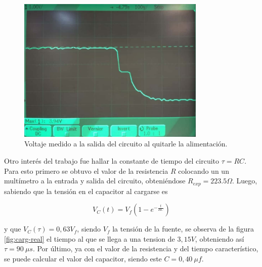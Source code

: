 \documentclass[a4paper]{article}
\begin{document}
\begin{figure}[H]
	\centering
	\includegraphics[width=0.8\textwidth]{Descarga-transitoria-real.jpeg}
	\caption{Voltaje medido a la salida del circuito al quitarle la alimentación.}
	\label{fig:desc-real}
\end{figure}


Otro interés del trabajo fue hallar la constante de tiempo del circuito $ \tau = RC $. Para esto primero se obtuvo el valor de la resistencia $ R $ colocando un un multímetro a la entrada y salida del circuito, obteniéndose $ R_{exp} = 223.5 \Omega $.
Luego, sabiendo que la tensión en el capacitor al cargarse es

\begin{equation}
	V_{C} (t) = V_{f} \left( 1 - e^{- \frac{t}{RC}  } \right)
	\label{eq:carg-eq}
\end{equation}

y que $ V_{C} (\tau) = 0,63 V_{f} $, siendo $ V_{f} $ la tensión de la fuente, se observa de la figura \ref{fig:carg-real} el tiempo al que se llega a una tension de $ 3,15 V $, obteniendo así $ \tau = 90\ \mu s $. Por último, ya con el valor de la resistencia y del tiempo característico, se puede calcular el valor del capacitor, siendo este $ C = 0,40\ \mu f $.

\end{document}
